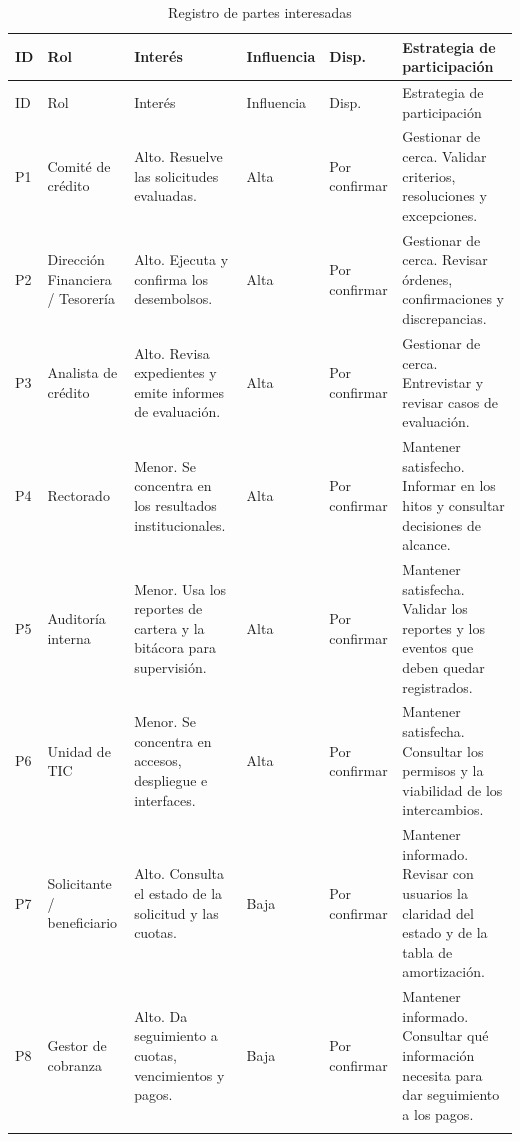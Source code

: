 \documentclass[11pt,a4paper]{article}
\begin{document}
\begingroup
\small
\setlength{\tabcolsep}{4pt}
\begin{longtable}{@{}L{.055}L{.17}L{.19}L{.095}L{.105}L{.26}@{}}
\caption{Registro de partes interesadas}\label{tab:partes}\\
\toprule
ID & Rol & Interés & Influencia & Disp. & Estrategia de participación \\
\midrule
\endfirsthead
\toprule
ID & Rol & Interés & Influencia & Disp. & Estrategia de participación \\
\midrule
\endhead
\bottomrule
\endfoot

P1 & Comité de crédito
& Alto. Resuelve las solicitudes evaluadas.
& Alta & Por confirmar
& Gestionar de cerca. Validar criterios, resoluciones y excepciones. \\
\addlinespace

P2 & Dirección Financiera / Tesorería
& Alto. Ejecuta y confirma los desembolsos.
& Alta & Por confirmar
& Gestionar de cerca. Revisar órdenes, confirmaciones y discrepancias. \\
\addlinespace

P3 & Analista de crédito
& Alto. Revisa expedientes y emite informes de evaluación.
& Alta & Por confirmar
& Gestionar de cerca. Entrevistar y revisar casos de evaluación. \\
\addlinespace

P4 & Rectorado
& Menor. Se concentra en los resultados institucionales.
& Alta & Por confirmar
& Mantener satisfecho. Informar en los hitos y consultar decisiones de alcance. \\
\addlinespace

P5 & Auditoría interna
& Menor. Usa los reportes de cartera y la bitácora para supervisión.
& Alta & Por confirmar
& Mantener satisfecha. Validar los reportes y los eventos que deben quedar registrados. \\
\addlinespace

P6 & Unidad de TIC
& Menor. Se concentra en accesos, despliegue e interfaces.
& Alta & Por confirmar
& Mantener satisfecha. Consultar los permisos y la viabilidad de los intercambios. \\
\addlinespace

P7 & Solicitante / beneficiario
& Alto. Consulta el estado de la solicitud y las cuotas.
& Baja & Por confirmar
& Mantener informado. Revisar con usuarios la claridad del estado y de la tabla de amortización. \\
\addlinespace

P8 & Gestor de cobranza
& Alto. Da seguimiento a cuotas, vencimientos y pagos.
& Baja & Por confirmar
& Mantener informado. Consultar qué información necesita para dar seguimiento a los pagos. \\
\addlinespace


\end{longtable}
\end{document}
